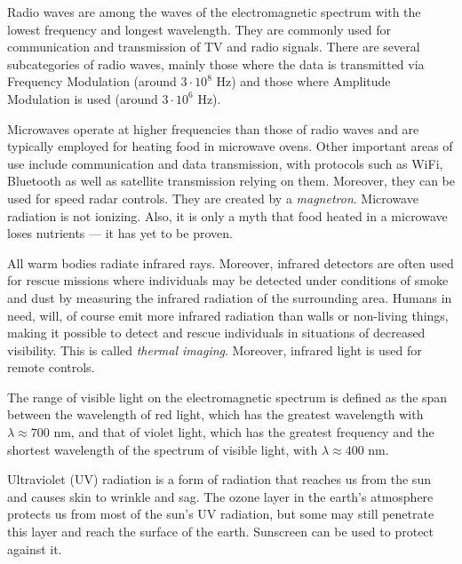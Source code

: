 \begin{itemize}

	Radio waves are among the waves of the electromagnetic spectrum with the lowest frequency and longest wavelength. They are commonly used for communication and transmission of TV and radio signals. There are several subcategories of radio waves, mainly those where the data is transmitted via Frequency Modulation (around $3 \cdot 10^8$ Hz) and those where Amplitude Modulation is used (around $3 \cdot 10^6$ Hz).


	Microwaves operate at higher frequencies than those of radio waves and are typically employed for heating food in microwave ovens. Other important areas of use include communication and data transmission, with protocols such as WiFi, Bluetooth as well as satellite transmission relying on them. Moreover, they can be used for speed radar controls. They are created by a \emph{magnetron}. Microwave radiation is not ionizing. Also, it is only a myth that food heated in a microwave loses nutrients --- it has yet to be proven.


	All warm bodies radiate infrared rays. Moreover, infrared detectors are often used for rescue missions where individuals may be detected under conditions of smoke and dust by measuring the infrared radiation of the surrounding area. Humans in need, will, of course emit more infrared radiation than walls or non-living things, making it possible to detect and rescue individuals in situations of decreased visibility. This is called \emph{thermal imaging}. Moreover, infrared light is used for remote controls.


	The range of visible light on the electromagnetic spectrum is defined as the span between the wavelength of red light, which has the greatest wavelength with $\lambda \approx 700$ nm, and that of violet light, which has the greatest frequency and the shortest wavelength of the spectrum of visible light, with $\lambda \approx 400$ nm.


	Ultraviolet (UV) radiation is a form of radiation that reaches us from the sun and causes skin to wrinkle and sag. The ozone layer in the earth's atmosphere protects us from most of the sun's UV radiation, but some may still penetrate this layer and reach the surface of the earth. Sunscreen can be used to protect against it. 


\end{itemize}

